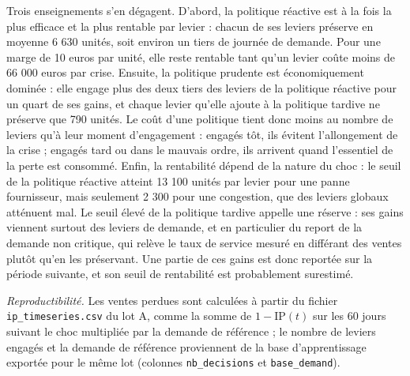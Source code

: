 Trois enseignements s'en dégagent. D'abord, la politique réactive est à la fois la plus efficace et la plus rentable par levier : chacun de ses leviers préserve en moyenne 6 630 unités, soit environ un tiers de journée de demande. Pour une marge de 10 euros par unité, elle reste rentable tant qu'un levier coûte moins de 66 000 euros par crise. Ensuite, la politique prudente est économiquement dominée : elle engage plus des deux tiers des leviers de la politique réactive pour un quart de ses gains, et chaque levier qu'elle ajoute à la politique tardive ne préserve que 790 unités. Le coût d'une politique tient donc moins au nombre de leviers qu'à leur moment d'engagement : engagés tôt, ils évitent l'allongement de la crise ; engagés tard ou dans le mauvais ordre, ils arrivent quand l'essentiel de la perte est consommé. Enfin, la rentabilité dépend de la nature du choc : le seuil de la politique réactive atteint 13 100 unités par levier pour une panne fournisseur, mais seulement 2 300 pour une congestion, que des leviers globaux atténuent mal. Le seuil élevé de la politique tardive appelle une réserve : ses gains viennent surtout des leviers de demande, et en particulier du report de la demande non critique, qui relève le taux de service mesuré en différant des ventes plutôt qu'en les préservant. Une partie de ces gains est donc reportée sur la période suivante, et son seuil de rentabilité est probablement surestimé.

\begin{center}

\label{fig:eco}
\end{center}

\textit{Reproductibilité.} Les ventes perdues sont calculées à partir du fichier \texttt{ip\_timeseries.csv} du lot A, comme la somme de $1 - \mathrm{IP}(t)$ sur les 60 jours suivant le choc multipliée par la demande de référence ; le nombre de leviers engagés et la demande de référence proviennent de la base d'apprentissage exportée pour le même lot (colonnes \texttt{nb\_decisions} et \texttt{base\_demand}).

